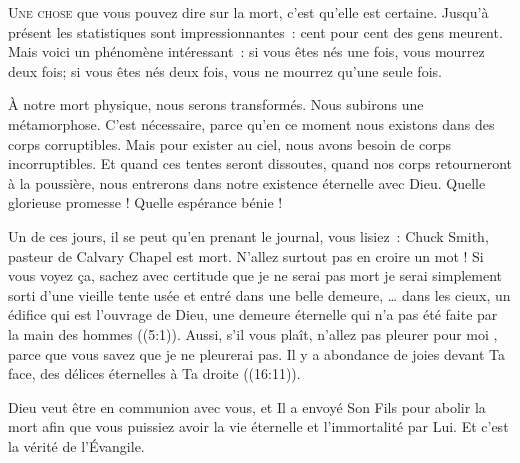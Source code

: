 \lettrine{U}{ne chose} que vous pouvez dire sur la mort,
 c'est qu'elle est certaine.
 Jusqu'à présent les statistiques sont impressionnantes~:
 cent pour cent des gens meurent. Mais voici un phénomène intéressant~:
 si vous êtes nés une fois, vous mourrez deux fois;
 si vous êtes nés deux fois, vous ne mourrez qu'une seule fois.

À notre mort physique, nous serons transformés.
 Nous subirons une métamorphose. C'est nécessaire, parce qu'en ce moment
 nous existons dans des corps corruptibles. Mais pour exister au ciel,
 nous avons besoin de corps incorruptibles. Et quand ces tentes
 seront dissoutes, quand nos corps retourneront à la poussière,
 nous entrerons dans notre existence éternelle avec Dieu.
 Quelle glorieuse promesse ! Quelle espérance bénie ! 


Un de ces jours, il se peut qu'en prenant le journal,
 vous lisiez~: 
 \og Chuck Smith, pasteur de Calvary Chapel est mort. \fg{}
 N'allez surtout pas en croire un mot ! Si vous voyez ça,
 sachez avec certitude que je ne serai pas mort \ocadr je serai simplement
 sorti d'une vieille tente usée et entré dans une belle demeure,
 \og \dots{} 
 dans les cieux, un édifice qui est l'ouvrage de Dieu, une demeure éternelle
 qui n'a pas été faite par la main des hommes \fg{} ((5:1)).
 Aussi, s'il vous plaît, n'allez pas pleurer pour moi
 , parce que vous savez que je ne pleurerai pas.
 \og Il y a abondance de joies devant Ta face, des délices éternelles
 à Ta droite \fg{} ((16:11)). 

Dieu veut être en communion avec vous, et Il a envoyé Son Fils pour abolir
 la mort afin que vous puissiez avoir la vie éternelle
 et l'immortalité par Lui. Et c'est la vérité de l'Évangile.

\dvrule






